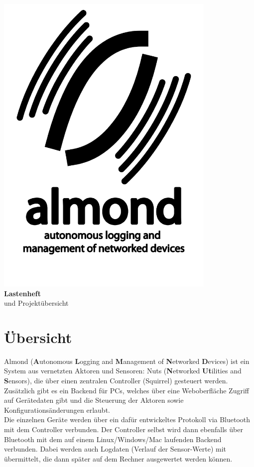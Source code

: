 \documentclass[12pt,a4paper]{article}
\begin{document}
\begin{titlepage}
	\begin{center}
		\includegraphics[height=15cm]{./logo.pdf}\\
		{\LARGE \bf Lastenheft}\\[0.3cm]
		{\large und Projektübersicht}
	\end{center}
\end{titlepage}

\tableofcontents

\newpage


\section{Übersicht}

Almond ({\bf A}utonomous {\bf L}ogging and {\bf M}anagement of {\bf N}etworked {\bf D}evices) ist ein System aus vernetzten Aktoren und Sensoren: Nuts ({\bf N}etworked {\bf Ut}ilities and {\bf S}ensors), die über einen zentralen Controller (Squirrel) gesteuert werden. Zusätzlich gibt es ein Backend für PCs, welches über eine Weboberfläche Zugriff auf Gerätedaten gibt und die Steuerung der Aktoren sowie Konfigurationsänderungen erlaubt.\\
Die einzelnen Geräte werden über ein dafür entwickeltes Protokoll via Bluetooth mit dem Controller verbunden. Der Controller selbst wird dann ebenfalls über Bluetooth mit dem auf einem Linux/Windows/Mac laufenden Backend verbunden. Dabei werden auch Logdaten (Verlauf der Sensor-Werte) mit übermittelt, die dann später auf dem Rechner ausgewertet werden können.
\end{document}
